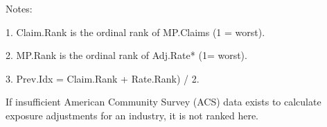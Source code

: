 \documentclass[9pt, oneside]{article}   	%
\begin{document}
    \begin{tablenotes}
      \small
      Notes:
      \\
            \item 1. Claim.Rank is the ordinal rank of MP.Claims (1 = worst). \\
            \item 2. MP.Rank is the ordinal rank of Adj.Rate* (1= worst). \\
            \item 3. Prev.Idx = Claim.Rank + Rate.Rank) / 2. \\
            \item *If insufficient American Community Survey (ACS) data exists to calculate exposure adjustments for an industry, it is not ranked here.   
    \end{tablenotes}
    


\pagebreak

\end{document}
